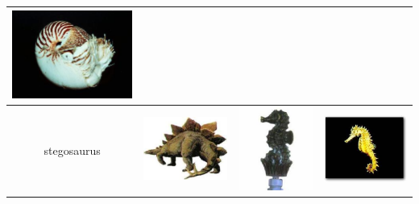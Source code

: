 \documentclass{article}
\begin{document}
\begin{table}[Ht]
\begin{tabular}{| c | c | c | c |}
\vspace{0cm}\includegraphics[scale=.1]{"Figures/False Matches/class_4_least_sure_wrong"} \\
\hline
stegosaurus &
\vspace{0cm}\includegraphics[scale=.1]{"Figures/Best Matches/bestmatch_c5"} &
\vspace{0cm}\includegraphics[scale=.1]{"Figures/False Matches/class_5_most_sure_wrong"} &
\vspace{0cm}\includegraphics[scale=.1]{"Figures/False Matches/class_5_least_sure_wrong"} \\
\hline
\end{tabular}
\end{table}
%
\end{document}
